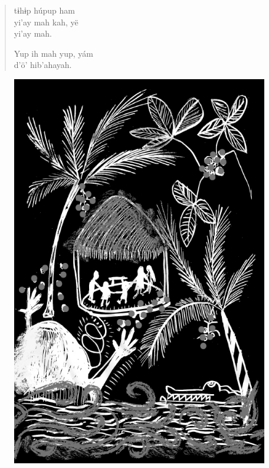 \begin{verse}
tɨhɨp húpup ham\\
yi’ay mah kah, yë\\
yi’ay mah.

Yup ih mah yup, yám\\
d’ö’ hib’ahayah.
\end{verse}

\vspace*{\fill}

\begin{figure}
\vspace*{-1.2cm}
\hspace*{-2.2cm}\includegraphics[width=138mm]{./imgs/img8.jpg}
\end{figure}

